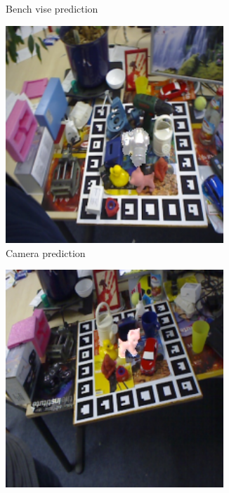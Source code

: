 \documentclass[../main.tex]{subfiles}
\begin{document}
\begin{figure}[H]
\begin{subfigure}[t]{0.19\textwidth}
        \caption{Bench vise prediction}
        \label{subfig:bench_vise_prediction}
    \end{subfigure}
    \begin{subfigure}[t]{0.19\textwidth}
        \centering
        \captionsetup{width=.9\textwidth}
        \includegraphics[width=0.9\textwidth]{figures/segmentation/cam_prediction.png}
        \caption{Camera prediction}
        \label{subfig:cam_prediction}
    \end{subfigure}
    \begin{subfigure}[t]{0.19\textwidth}
        \centering
        \captionsetup{width=.9\textwidth}
        \includegraphics[width=0.9\textwidth]{figures/segmentation/cat_prediction.png}

\end{subfigure}
\end{figure}
\end{document}
